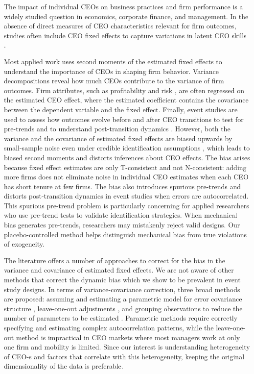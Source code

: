 \documentclass[11pt,a4paper]{article}
\begin{document}
The impact of individual CEOs on business practices and firm performance is a widely studied question in economics, corporate finance, and management. In the absence of direct measures of CEO characteristics relevant for firm outcomes, studies often include CEO fixed effects to capture variations in latent CEO skills \citep{Bertrand2003-io, crossland2011differences, quigley2015has}. 

Most applied work uses second moments of the estimated fixed effects to understand the importance of CEOs in shaping firm behavior. Variance decompositions reveal how much CEOs contribute to the variance of firm outcomes. Firm attributes, such as profitability \citep{mackey2008effect} and risk \citep{schoar2024effect}, are often regressed on the estimated CEO effect, where the estimated coefficient contains the covariance between the dependent variable and the fixed effect. Finally, event studies are used to assess how outcomes evolve before and after CEO transitions to test for pre-trends and to understand post-transition dynamics \citep{schoar2024effect}. However, both the variance and the covariance of estimated fixed effects are biased upwards by small-sample noise even under credible identification assumptions
\citep{andrews2008high,gaure2014correlation,bonhomme2023much}, which leads to biased second moments and distorts inferences about CEO effects. The bias arises because fixed effect estimates are only T-consistent and not N-consistent: adding more firms does not eliminate noise in individual CEO estimates when each CEO has short tenure at few firms. The bias also introduces spurious pre-trends and distorts post-transition dynamics in event studies when errors are autocorrelated. This spurious pre-trend problem is particularly concerning for applied researchers who use pre-trend tests to validate identification strategies. When mechanical bias generates pre-trends, researchers may mistakenly reject valid designs. Our placebo-controlled method helps distinguish mechanical bias from true violations of exogeneity.

The literature offers a number of approaches to correct for the bias in the variance and covariance of estimated fixed effects. We are not aware of other methods that correct the dynamic bias which we show to be prevalent in event study designs. In terms of variance-covariance correction, three broad methods are proposed: assuming and estimating a parametric model for error covariance structure \citep{andrews2008high,gaure2014correlation,kline2024firm}, leave-one-out adjustments \citep{kline2020leave}, and grouping observations to reduce the number of parameters to be estimated \citep{Bonhomme2019-xi,bonhomme2023much}. Parametric methods require correctly specifying and estimating complex autocorrelation patterns, while the leave-one-out method is impractical in CEO markets where most managers work at only one firm and mobility is limited. Since our interest is understanding heterogeneity of CEO-s and factors that correlate with this heterogeneity, keeping the original  dimensionality of the data is preferable. 
\end{document}
